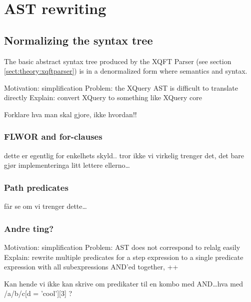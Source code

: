 \section{AST rewriting}
\subsection{Normalizing the syntax tree}
The basic abstract syntax tree produced by the XQFT Parser (see section
\ref{sect:theory:xqftparser}) is in a denormalized form where semantics and
syntax.


Motivation: simplification
Problem: the XQuery AST is difficult to translate directly
Explain: convert XQuery to something like XQuery core

Forklare hva man skal gjore, ikke hvordan!!

\subsubsection{FLWOR and for-clauses}
dette er egentlig for enkelhets skyld.. tror ikke vi virkelig trenger det, det bare gj\o r implementeringa litt
lettere ellerno\ldots
\subsubsection{Path predicates}
f\aa r se om vi trenger dette\ldots
\subsubsection{Andre ting?}
 
Motivation: simplification
Problem: AST does not correspond to relalg easily
Explain: rewrite multiple predicates for a step expression to a single 
         predicate expression with all subexpressions AND'ed together, ++
         
Kan hende vi ikke kan skrive om predikater til en kombo med AND\ldots hva med
/a/b/c[d = 'cool'][3] ?
